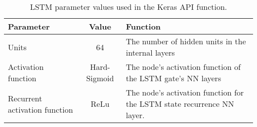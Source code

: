 
\begin{table}[ht!]
    \centering
    \caption{\ac{LSTM} parameter values used in the Keras API function.}
    \begin{tabular}{>{\raggedright}p{} | c | p{}}
        Parameter                       & Value         & Function \\ \hline
        Units                           & 64            & The number of hidden units in the internal layers\\
        Activation function             & Hard-Sigmoid  & The node's activation function of the \ac{LSTM} gate's \ac{NN} layers\\
        Recurrent activation function   & ReLu          & The node's activation function for the \ac{LSTM} state recurrence \ac{NN} layer.
    \end{tabular}
    \label{tab:lstm-parameters}
\end{table}